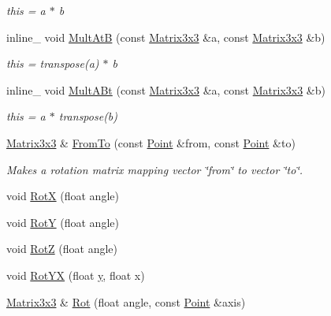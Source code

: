\begin{DoxyCompactItemize}
\begin{DoxyCompactList}\small\item\em this = a $\ast$ b \end{DoxyCompactList}\item 
inline\+\_\+ void \hyperlink{classMatrix3x3_acaaf066874db7aecf219c362a9029de6}{Mult\+AtB} (const \hyperlink{classMatrix3x3}{Matrix3x3} \&a, const \hyperlink{classMatrix3x3}{Matrix3x3} \&b)\hypertarget{classMatrix3x3_acaaf066874db7aecf219c362a9029de6}{}\label{classMatrix3x3_acaaf066874db7aecf219c362a9029de6}

\begin{DoxyCompactList}\small\item\em this = transpose(a) $\ast$ b \end{DoxyCompactList}\item 
inline\+\_\+ void \hyperlink{classMatrix3x3_a4df37cc8e30c8eb512c9645ea3446823}{Mult\+A\+Bt} (const \hyperlink{classMatrix3x3}{Matrix3x3} \&a, const \hyperlink{classMatrix3x3}{Matrix3x3} \&b)\hypertarget{classMatrix3x3_a4df37cc8e30c8eb512c9645ea3446823}{}\label{classMatrix3x3_a4df37cc8e30c8eb512c9645ea3446823}

\begin{DoxyCompactList}\small\item\em this = a $\ast$ transpose(b) \end{DoxyCompactList}\item 
\hyperlink{classMatrix3x3}{Matrix3x3} \& \hyperlink{classMatrix3x3_aa2420e6446d215b6146fe6c09563fdf0}{From\+To} (const \hyperlink{classPoint}{Point} \&from, const \hyperlink{classPoint}{Point} \&to)\hypertarget{classMatrix3x3_aa2420e6446d215b6146fe6c09563fdf0}{}\label{classMatrix3x3_aa2420e6446d215b6146fe6c09563fdf0}

\begin{DoxyCompactList}\small\item\em Makes a rotation matrix mapping vector \char`\"{}from\char`\"{} to vector \char`\"{}to\char`\"{}. \end{DoxyCompactList}\item 
void \hyperlink{classMatrix3x3_a2085f5fbfdc084bad6ec574e2efaec9c}{RotX} (float angle)
\item 
void \hyperlink{classMatrix3x3_a042b69c07653ba64a03a32f0912e16b3}{RotY} (float angle)
\item 
void \hyperlink{classMatrix3x3_ac95efa91905c221156b7b2ab58b946b8}{RotZ} (float angle)
\item 
void \hyperlink{classMatrix3x3_a7c4719756d1d0b58286f50258b645438}{Rot\+YX} (float \hyperlink{IceUtils_8h_aa7ffaed69623192258fb8679569ff9ba}{y}, float x)
\item 
\hyperlink{classMatrix3x3}{Matrix3x3} \& \hyperlink{classMatrix3x3_a945f9b8cc98fa3e2156acd531262c37b}{Rot} (float angle, const \hyperlink{classPoint}{Point} \&axis)\hypertarget{classMatrix3x3_a945f9b8cc98fa3e2156acd531262c37b}{}\label{classMatrix3x3_a945f9b8cc98fa3e2156acd531262c37b}


\end{DoxyCompactItemize}
